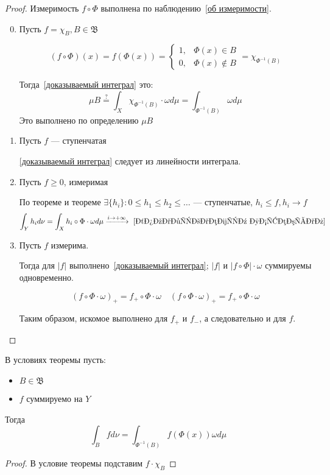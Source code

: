 \begin{proof}
    Измеримость \(f\circ \Phi\) выполнена по наблюдению~\ref{об измеримости}.

    \begin{enumerate}
        \setcounter{enumi}{-1}
        \item Пусть \(f = \chi_B, B \in \mathfrak{B}\)

              \[(f \circ \Phi)(x) = f(\Phi(x)) = \begin{cases}
                      1, & \Phi(x) \in B     \\
                      0, & \Phi(x) \notin B
                  \end{cases} = \chi_{\Phi^{-1}(B)}\]

              Тогда~\eqref{доказываемый интеграл} это:
              \[\mu B \stackrel{?}{ =} \int_X \chi_{\Phi^{-1}(B)} \cdot \omega d\mu = \int_{\Phi^{-1}(B)} \omega d\mu\]
              Это выполнено по определению \(\mu B\)

        \item Пусть \(f\) --- ступенчатая

              \eqref{доказываемый интеграл} следует из линейности интеграла.

        \item Пусть \(f \geq 0\), измеримая

              По теореме  и теореме  \(\exists \{h_i\} : 0 \leq h_1 \leq h_2 \leq \dots \) --- ступенчатые, \(h_i \leq f, h_i \to f\)
              \[\int_Y h_i d\nu = \int_X h_i \circ \Phi \cdot \omega d \mu \xrightarrow{i \to +\infty}~\eqref{доказываемый интеграл}\]

        \item Пусть \(f\) измерима.

              Тогда для \(|f|\) выполнено~\eqref{доказываемый интеграл}; \(|f|\) и \(|f\circ \Phi|\cdot \omega\) суммируемы одновременно.

              \[(f \circ \Phi\cdot \omega)_+ = f_+ \circ \Phi \cdot \omega \quad (f \circ \Phi\cdot \omega)_+ = f_+ \circ \Phi \cdot \omega\]

              Таким образом, искомое выполнено для \(f_+\) и \(f_-\), а следовательно и для \(f\).
    \end{enumerate}
\end{proof}

\begin{corollary}
    В условиях теоремы пусть:
    \begin{itemize}
        \item \(B\in \mathfrak{B}\)
        \item \(f\) суммируемо на \(Y\)
    \end{itemize}

    Тогда
    \[\int_B f d \nu = \int_{\Phi^{-1}(B)} f(\Phi(x)) \omega d\mu\]
\end{corollary}
\begin{proof}
    В условие теоремы подставим \(f \cdot \chi_B\)
\end{proof}


